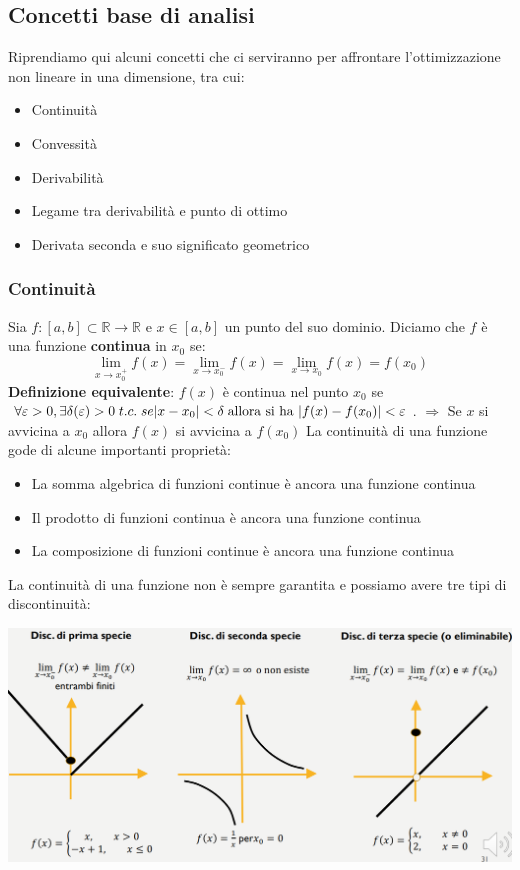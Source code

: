 \documentclass[12pt]{article}
\begin{document}
\subsection{Concetti base di analisi}
Riprendiamo qui alcuni concetti che ci serviranno per affrontare l'ottimizzazione non lineare in una dimensione, tra cui:
\begin{itemize}
    \item Continuità
    \item Convessità
    \item Derivabilità
    \item Legame tra derivabilità e punto di ottimo
    \item Derivata seconda e suo significato geometrico
\end{itemize}
\subsubsection{Continuità}
Sia $f:[a,b] \subset \mathbb{R} \rightarrow \mathbb{R}$ e $x \in [a,b]$ un punto del suo dominio.
Diciamo che $f$ è una funzione \textbf{continua} in $x_0$ se:
$$\lim_{x \rightarrow x_0^+} f(x) = \lim_{x \rightarrow x_0^-} f(x) = \lim_{x \rightarrow x_0} f(x) = f(x_0)$$
\textbf{Definizione equivalente}: $f(x)$ è continua nel punto $x_0$ se $\forall \varepsilon > 0, \exists \delta(\varepsilon) > 0 \; t.c. \; se \; \newline |x-x_0| < \delta \; \textrm{allora si ha } |f(x) - f(x_0)| < \varepsilon$. $\Rightarrow$
Se $x$ si avvicina a $x_0$ allora $f(x)$ si avvicina a $f(x_0)$ \newline
La continuità di una funzione gode di alcune importanti proprietà:
\begin{itemize}
    \item La somma algebrica di funzioni continue è ancora una funzione continua
    \item Il prodotto di funzioni continua è ancora una funzione continua 
    \item La composizione di funzioni continue è ancora una funzione continua
\end{itemize}
La continuità di una funzione non è sempre garantita e possiamo avere tre tipi di discontinuità:
\begin{center}
    \includegraphics[width = 1\linewidth]{Images/89.png}
\end{center}
\end{document}
